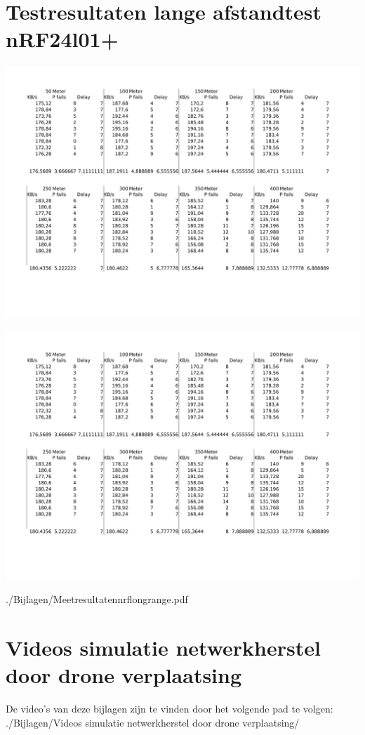 \documentclass[a4paper, 11pt, oneside]{report}
\begin{document}
\chapter{Testresultaten lange afstandtest nRF24l01+}\label{app:testresultaten-lange-afstandtest-nrf24l01}
\begin{center}\includegraphics[page=1,width=.8\linewidth]{Bijlagen/Meetresultatennrflongrange.pdf}\end{center}
\begin{center}\includegraphics[page=2,width=.8\linewidth]{Bijlagen/Meetresultatennrflongrange.pdf}\end{center}
./Bijlagen/Meetresultatennrflongrange.pdf

\chapter{Videos simulatie netwerkherstel door drone verplaatsing}\label{sec:videos-simulatie-netwerkherstel-door-drone-verplaatsing}
De video's van deze bijlagen zijn te vinden door het volgende pad te volgen: \newline
./Bijlagen/Videos simulatie netwerkherstel door drone verplaatsing/
\end{document}
